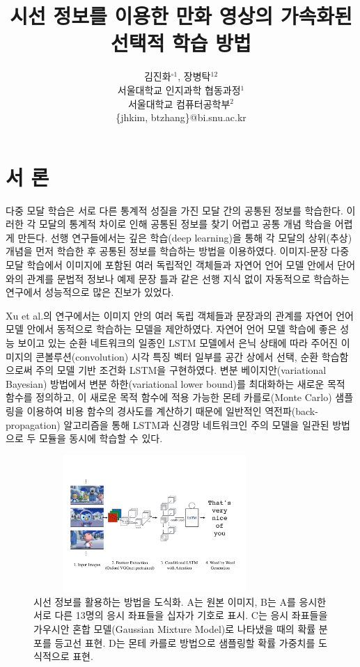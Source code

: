 \documentclass{kcc}
\title{시선 정보를 이용한 만화 영상의 가속화된 선택적 학습 방법}
\author{
김진화$^{\circ1}$, 장병탁$^{12}$\\
서울대학교 인지과학 협동과정$^{1}$\\
서울대학교 컴퓨터공학부$^{2}$\\
\{jhkim, btzhang\}@bi.snu.ac.kr
}
\begin{document}
\maketitle


\section{서 론}

다중 모달 학습은 서로 다른 통계적 성질을 가진 모달 간의 공통된 정보를 학습한다. 이러한 각 모달의 통계적 차이로 인해 공통된 정보를 찾기 어렵고 공통 개념 학습을 어렵게 만든다. 선행 연구들에서는 깊은 학습(deep learning)을 통해 각 모달의 상위(추상) 개념을 먼저 학습한 후 공통된 정보를 학습하는 방법을 이용하였다\cite{Ngiam2011,NIPS2012_4683,Kiros2013,NIPS2014_5279}. 이미지-문장 다중 모달 학습에서 이미지에 포함된 여러 독립적인 객체들과 자연어 언어 모델 안에서 단어와의 관계를 문법적 정보나 예제 문장 틀과 같은 선행 지식 없이 자동적으로 학습하는 연구에서 성능적으로 많은 진보가 있었다\cite{Kiros2013,Yu2013,Karpathy}.

Xu et al.\cite{Xu2015}의 연구에서는 이미지 안의 여러 독립 객체들과 문장과의 관계를 자연어 언어 모델 안에서 동적으로 학습하는 모델을 제안하였다. 자연어 언어 모델 학습에 좋은 성능 보이고 있는 순환 네트워크의 일종인 LSTM 모델에서 은닉 상태에 따라 주어진 이미지의 콘볼루션(convolution) 시각 특징 벡터 일부를 공간 상에서 선택\cite{Oh2011,zhang1994accelerated}, 순환 학습함으로써 주의 모델 기반 조건화 LSTM을 구현하였다. 변분 베이지안(variational Bayesian) 방법에서 변분 하한(variational lower bound)를 최대화하는 새로운 목적 함수를 정의하고, 이 새로운 목적 함수에 적용 가능한 몬테 카를로(Monte Carlo) 샘플링을 이용하여 비용 함수의 경사도를 계산하기 때문에 일반적인 역전파(back-propagation) 알고리즘을 통해 LSTM과 신경망 네트워크인 주의 모델을 일관된 방법으로 두 모듈을 동시에 학습할 수 있다.

\begin{figure}[ht!]
  \centerline{\includegraphics[width=92mm,height=52mm,trim=15mm 40mm 15mm 40mm]{eps/pororo_alstm.pdf}}
  \caption{시선 정보를 활용하는 방법을 도식화. A는 원본 이미지, B는 A를 응시한 서로 다른 13명의 응시 좌표들을 십자가 기호로 표시. C는 응시 좌표들을 가우시안 혼합 모델(Gaussian Mixture Model)로 나타냈을 때의 확률 분포를 등고선 표현. D는 몬테 카를로 방법으로 샘플링할 확률 가중치를 도식적으로 표현.}
  \label{fig:selective}
\end{figure}
\end{document}
